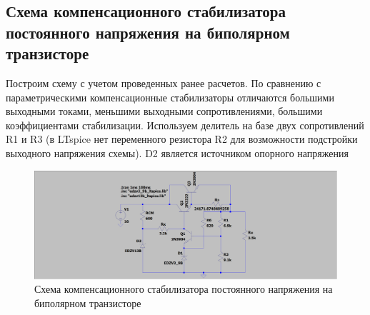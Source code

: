 \documentclass[a4paper, 12pt]{article}
\begin{document}
    \subsection{Схема компенсационного стабилизатора постоянного напряжения на биполярном транзисторе}
    Построим схему с учетом проведенных ранее расчетов.
    По сравнению с параметрическими компенсационные стабилизаторы
    отличаются большими выходными токами, меньшими выходными сопротивлениями,
    большими коэффициентами стабилизации. Используем делитель на базе двух сопротивлений R1 и R3
    (в LTspice нет переменного резистора R2 для возможности подстройки выходного напряжения схемы).
    D2 является источником опорного напряжения
    \begin{figure}[H]
        \centering
        \includegraphics[scale=0.22]{3task_scheme_A.png}
        \captionsetup{skip=0pt}
        \caption{Схема компенсационного стабилизатора постоянного напряжения на биполярном транзисторе}
        \label{fig:3task_scheme_A}
    \end{figure}
\end{document}
